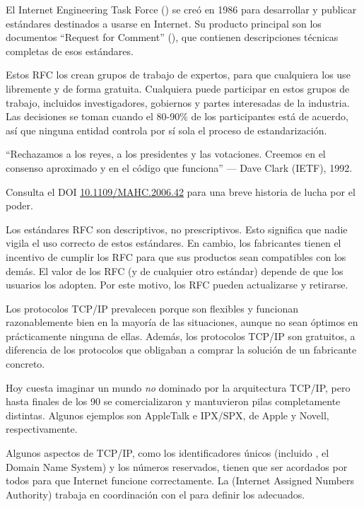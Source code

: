 El Internet Engineering Task Force () se creó en 1986
para desarrollar y publicar estándares destinados a usarse en Internet. 
% 
Su producto principal son los documentos ``Request for Comment'' (),
que contienen descripciones técnicas completas de esos estándares.


Estos RFC los crean grupos de trabajo de expertos, 
para que cualquiera los use libremente y de forma gratuita. 
% 
Cualquiera puede participar en estos grupos de trabajo, incluidos investigadores,
gobiernos y partes interesadas de la industria. 
% 
Las decisiones se toman cuando el 80-90\% de los participantes está de acuerdo, así que ninguna 
entidad controla por sí sola el proceso de estandarización.
% 
\begin{remark}
``Rechazamos a los reyes, a los presidentes y las votaciones. 
Creemos en el consenso aproximado y en el código que funciona'' 
--- Dave Clark (IETF), 1992.

Consulta el DOI \href{https://dx.doi.org/10.1109/MAHC.2006.42}{\underline{10.1109/MAHC.2006.42}} para 
una breve historia de lucha por el poder.
\end{remark}

Los estándares RFC son descriptivos, no prescriptivos. Esto significa que nadie vigila el uso 
correcto de estos estándares. En cambio, los fabricantes tienen el incentivo de cumplir los RFC 
para que sus productos sean compatibles con los demás. 
% 
El valor de los RFC (y de cualquier otro estándar) depende de que
los usuarios los adopten. Por este motivo, los RFC pueden actualizarse y retirarse.

Los protocolos TCP/IP prevalecen porque son flexibles y funcionan razonablemente bien en la mayoría de las situaciones, 
aunque no sean óptimos en prácticamente ninguna de ellas. 
Además, los protocolos TCP/IP son gratuitos, a diferencia de los protocolos 
que obligaban a comprar la solución de un fabricante concreto.
% 
\begin{remark}
Hoy cuesta imaginar un mundo \textit{no} 
dominado por la arquitectura TCP/IP, 
pero hasta finales de los 90 se comercializaron y mantuvieron pilas completamente distintas.
Algunos ejemplos son AppleTalk e IPX/SPX, de Apple y Novell, respectivamente.
\end{remark}


Algunos aspectos de TCP/IP, como los identificadores únicos 
(incluido , el Domain Name System)
y los números reservados, tienen que ser acordados por todos para que Internet funcione correctamente.
% 
La  (Internet Assigned Numbers Authority) trabaja en coordinación con el 
para definir los  adecuados.

